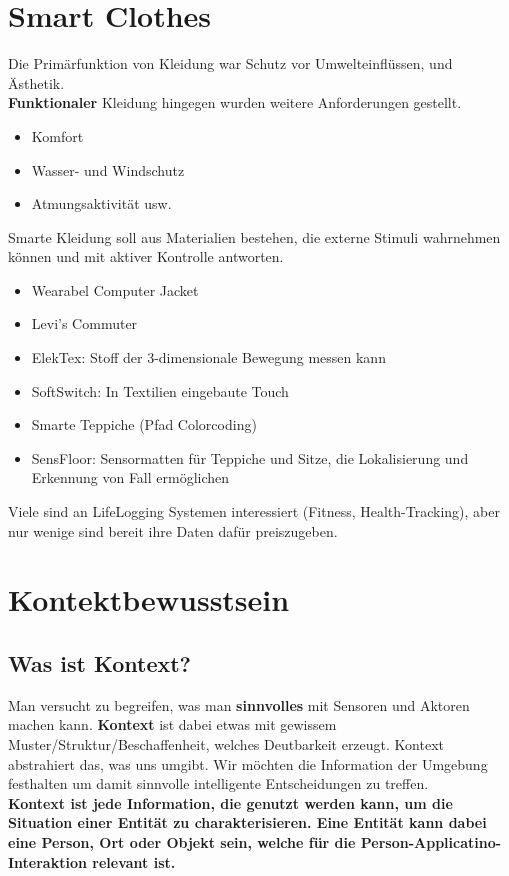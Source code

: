 \documentclass[a4paper]{article}
\begin{document}
\section{Smart Clothes}
Die Primärfunktion von Kleidung war Schutz vor Umwelteinflüssen, und Ästhetik.\\
\textbf{Funktionaler} Kleidung hingegen wurden weitere Anforderungen gestellt. 
\begin{itemize}
	\item Komfort
	\item Wasser- und Windschutz
	\item Atmungsaktivität usw.
\end{itemize}
Smarte Kleidung soll aus Materialien bestehen, die externe Stimuli wahrnehmen können und mit aktiver Kontrolle antworten.
\begin{itemize}
	\item Wearabel Computer Jacket
	\item Levi's Commuter
	\item ElekTex: Stoff der 3-dimensionale Bewegung messen kann
	\item SoftSwitch: In Textilien eingebaute Touch
	\item Smarte Teppiche (Pfad Colorcoding)
	\item SensFloor: Sensormatten für Teppiche und Sitze, die Lokalisierung und Erkennung von Fall ermöglichen
\end{itemize}
Viele sind an LifeLogging Systemen interessiert (Fitness, Health-Tracking), aber nur wenige sind bereit ihre Daten dafür preiszugeben.

\newpage
\section{Kontektbewusstsein}
\subsection{Was ist Kontext?}
Man versucht zu begreifen, was man \textbf{sinnvolles} mit Sensoren und Aktoren machen kann. \textbf{Kontext} ist dabei etwas mit gewissem Muster/Struktur/Beschaffenheit, welches Deutbarkeit erzeugt. Kontext abstrahiert das, was uns umgibt. Wir möchten die Information der Umgebung festhalten um damit sinnvolle intelligente Entscheidungen zu treffen.\\

\textbf{Kontext ist jede Information, die genutzt werden kann, um die Situation einer Entität zu charakterisieren. Eine Entität kann dabei eine Person, Ort oder Objekt sein, welche für die Person-Applicatino-Interaktion relevant ist.}\\
\end{document}
